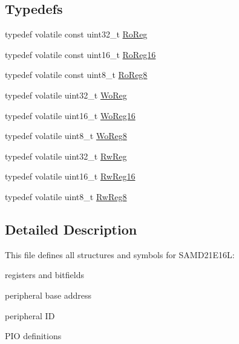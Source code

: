 \subsection*{Typedefs}
\begin{DoxyCompactItemize}
\item 
typedef volatile const uint32\+\_\+t \mbox{\hyperlink{group___s_a_m_d21_e16_l__definitions_ga5d556f8391af4141be23f7334ac9dd68}{Ro\+Reg}}
\item 
typedef volatile const uint16\+\_\+t \mbox{\hyperlink{group___s_a_m_d21_e16_l__definitions_gaebf6e33c2d49a802e06e22a95ea9d0d0}{Ro\+Reg16}}
\item 
typedef volatile const uint8\+\_\+t \mbox{\hyperlink{group___s_a_m_d21_e16_l__definitions_ga0d957f1433aaf5d70e4dc2b68288442d}{Ro\+Reg8}}
\item 
typedef volatile uint32\+\_\+t \mbox{\hyperlink{group___s_a_m_d21_e16_l__definitions_gac0f96d4e8018367b38f527007cf0eafd}{Wo\+Reg}}
\item 
typedef volatile uint16\+\_\+t \mbox{\hyperlink{group___s_a_m_d21_e16_l__definitions_ga0ab0e5f6c8301aa1c2068e511d854094}{Wo\+Reg16}}
\item 
typedef volatile uint8\+\_\+t \mbox{\hyperlink{group___s_a_m_d21_e16_l__definitions_ga5e336e5a36ee12ebeafb021108e5275b}{Wo\+Reg8}}
\item 
typedef volatile uint32\+\_\+t \mbox{\hyperlink{group___s_a_m_d21_e16_l__definitions_gacf1496e3bbe303e55f627fc7558a68c7}{Rw\+Reg}}
\item 
typedef volatile uint16\+\_\+t \mbox{\hyperlink{group___s_a_m_d21_e16_l__definitions_gacce07556c80fc352ae607f225f19fed5}{Rw\+Reg16}}
\item 
typedef volatile uint8\+\_\+t \mbox{\hyperlink{group___s_a_m_d21_e16_l__definitions_gae361754be775bb192f85821d3ab33c17}{Rw\+Reg8}}
\end{DoxyCompactItemize}


\subsection{Detailed Description}
This file defines all structures and symbols for S\+A\+M\+D21\+E16L\+:
\begin{DoxyItemize}
\item registers and bitfields
\item peripheral base address
\item peripheral ID
\item P\+IO definitions 
\end{DoxyItemize}

